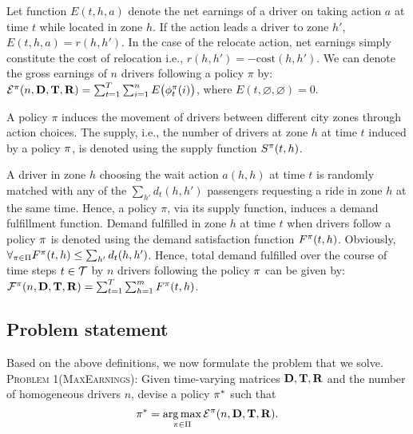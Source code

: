 Let function $E(t, h, a)$ denote the net earnings of a driver 
    on taking action $a$ at time $t$ while located in zone $h$. 
If the action leads a driver to zone $h'$, $E(t, h, a) = r(h, h')$. 
In the case of the relocate action, net earnings simply constitute the cost of 
    relocation i.e., 
    $r(h,h') = - \textrm{cost}(h, h')$.
We can denote the gross earnings of $n$ drivers following a policy $\pi$ by:
    $\mathcal{E}^{{{\pi}}}(n, {{\mathbf{D}}}, {{\mathbf{T}}}, {{\mathbf{R}}}) =
    \sum_{t=1}^{T} \sum_{i=1}^{n}  E\big(\phi^
    {{{\pi}}}_t(i)\big)$,
    where $E(t, \varnothing, \varnothing) = 0$. 

A policy $\pi$ induces the movement of drivers between different city zones
    through action choices. 
The supply, i.e., the number of drivers at zone $h$ at time
    $t$ induced by a policy ${{\pi}}$, is denoted using the supply function
    $S^{{{\pi}}}(t, h)$.  

A driver in zone $h$ choosing the wait action $a(h,h)$ at time $t$ is randomly
    matched with any of the $\sum_{h'}d_t(h,h')$ passengers requesting a ride in zone
    $h$ at the same time.
Hence, a policy $\pi$, via its supply function, induces a demand fulfillment function. 
Demand fulfilled in zone $h$ at time $t$ when drivers follow a policy
    ${{\pi}}$ is denoted using the demand satisfaction function
    $F^{{{\pi}}}(t, h)$. 
Obviously, $\forall_{{{\pi}} \in \Pi}
    F^{{{\pi}}}(t, h) \leq \sum_{h'} d_t(h, h')$. 
Hence, total demand fulfilled over the course of time steps $t \in {{{\ensuremath{\mathcal{T}}}}}$ 
    by $n$ drivers following the policy ${{\pi}}$ can be given by:
    $\mathcal{F}^{{{\pi}}}(n,{{\mathbf{D}}}, {{\mathbf{T}}}, {{\mathbf{R}}}) =
    \sum_{t=1}^{T} \sum_{h=1}^{m}  F ^{{{\pi}}}(t, h)$.

\subsection{Problem statement}
Based on the above definitions, we now formulate the problem that we 
    solve.\\

\noindent\textsc{Problem 1(MaxEarnings):} Given time-varying matrices ${{\mathbf{D}}},
    {{\mathbf{T}}}, {{\mathbf{R}}}$ and the number of homogeneous drivers $n$,
    devise a policy ${{\pi}}^*$ such that
    \begin{equation}
    \label{eq:max_earnings_problem}
    \policy^* = \argmax_{\policy \in \Pi} \mathcal{E}^{\policy}(n,\demandmatrix,
    \traveltimematrix, \rewardmatrix).
    \end{equation}

